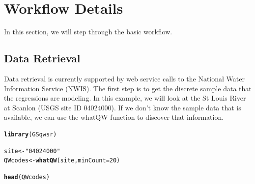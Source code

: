 \documentclass[a4paper,11pt]{article}\usepackage[]{graphicx}\usepackage[]{color}
\makeatletter
\newcommand{\hlstr}[1]{\textcolor[rgb]{0.192,0.494,0.8}{#1}}%
\newcommand{\hlkwd}[1]{\textcolor[rgb]{0.737,0.353,0.396}{\textbf{#1}}}%
\newenvironment{kframe}{%
 \def\at@end@of@kframe{}%
 \ifinner\ifhmode%
  \def\at@end@of@kframe{\end{minipage}}%
  \begin{minipage}{\columnwidth}%
 \fi\fi%
 \def\FrameCommand##1{\hskip\@totalleftmargin \hskip-\fboxsep
 \colorbox{shadecolor}{##1}\hskip-\fboxsep
     \hskip-\linewidth \hskip-\@totalleftmargin \hskip\columnwidth}%
 \MakeFramed {\advance\hsize-\width
   \@totalleftmargin\z@ \linewidth\hsize
   \@setminipage}}%
 {\par\unskip\endMakeFramed%
 \at@end@of@kframe}
\newenvironment{knitrout}{}{} %
\makeatother
\begin{document}
\section{Workflow Details}
\label{sec:details}
In this section, we will step through the basic workflow.

\subsection{Data Retrieval}
Data retrieval is currently supported by web service calls to the National Water Information Service (NWIS). The first step is to get the discrete sample data that the regressions are modeling. In this example, we will look at the St Louis River at Scanlon (USGS site ID 04024000). If we don't know the sample data that is available, we can use the whatQW function to discover that information. 

\begin{knitrout}
\color{fgcolor}\begin{kframe}
\begin{alltt}
\hlkwd{library}(GSqwsr)
\end{alltt}
\end{kframe}
\end{knitrout}


\begin{knitrout}
\color{fgcolor}\begin{kframe}


{\ttfamily\noindent\color{warningcolor}{Warning: package 'lattice' was built under R version 3.0.2}}\end{kframe}
\end{knitrout}



\begin{knitrout}
\color{fgcolor}\begin{kframe}
\begin{alltt}

site <- \hlstr{"04024000"}  
QWcodes <- \hlkwd{whatQW}(site, minCount=20)
\end{alltt}


{\ttfamily\noindent\color{warningcolor}{Warning: unable to resolve 'waterservices.usgs.gov'}}

{\ttfamily\noindent\bfseries\color{errorcolor}{Error: cannot open the connection}}\begin{alltt}
\hlkwd{head}(QWcodes)
\end{alltt}


{\ttfamily\noindent\bfseries\color{errorcolor}{Error: object 'QWcodes' not found}}\end{kframe}
\end{knitrout}
\end{document}
